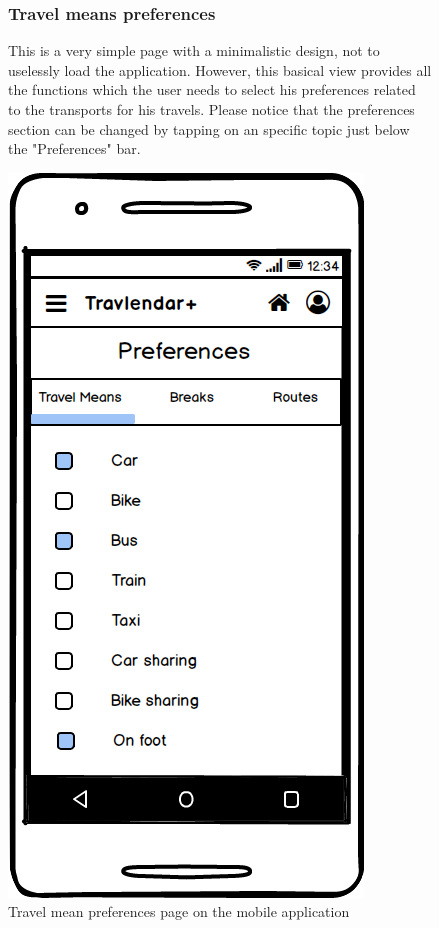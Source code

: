	\begin{figure}
				\begin{flushleft}
				\subsubsection{Travel means preferences}
			This is a very simple page with a minimalistic design, not to uselessly load the application. However, this basical view provides all the functions which the user needs to select his preferences related to the transports for his travels. 
			Please notice that the preferences section can be changed by tapping on an specific topic just below the "Preferences" bar.
		\end{flushleft}
		\centering
		\includegraphics[width=0.6\linewidth]{mockups/PreferencesTravelMeans}
		\caption{Travel mean preferences page on the mobile application}
		\label{fig:preferencestravelmeans}
	\end{figure}
	
